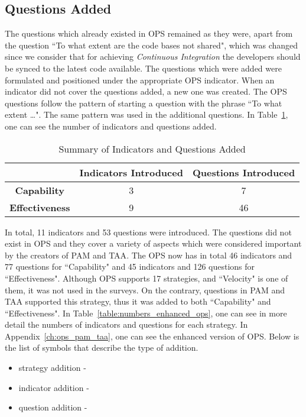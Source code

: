 \subsection{Questions Added}
The questions which already existed in \ac{OPS} remained as they were, apart from the question ``To what extent are the code bases not shared", which was changed since we consider that for achieving \textit{Continuous Integration} the developers should be synced to the latest code available. The questions which were added were formulated and positioned under the appropriate \ac{OPS} indicator. When an indicator did not cover the questions added, a new one was created. The \ac{OPS} questions follow the pattern of starting a question with the phrase ``To what extent \dots ". The same pattern was used in the additional questions. In Table~\ref{table:summary_questions_added}, one can see the number of indicators and questions added. 

\begin{table} [H]
	\caption{Summary of Indicators and Questions Added}
	\label{table:summary_questions_added}
	\begin{tabular}{| c | c | c |} \hline
		 & \textbf{Indicators Introduced} & \textbf{Questions Introduced} \\ \hline
		 \textbf{Capability} & 3 & 7 \\ \hline
		 \textbf{Effectiveness} & 9 & 46 \\ \hline
	\end{tabular}
\end{table}

In total, 11 indicators and 53 questions were introduced. The questions did not exist in \ac{OPS} and they cover a variety of aspects which were considered important by the creators of \ac{PAM} and \ac{TAA}. The \ac{OPS} now has in total 46 indicators and 77 questions for ``Capability" and 45 indicators and 126 questions for ``Effectiveness". Although \ac{OPS} supports 17 strategies, and ``Velocity" is one of them, it was not used in the surveys. On the contrary, questions in \ac{PAM} and \ac{TAA} supported this strategy, thus it was added to both ``Capability" and ``Effectiveness". In Table~\ref{table:numbers_enhanced_ops}, one can see in more detail the numbers of indicators and questions for each strategy. In Appendix~\ref{ch:ops_pam_taa}, one can see the enhanced version of \ac{OPS}. Below is the list of symbols that describe the type of addition.

\begin{itemize}
	\item strategy addition - \TwelweStar
	\item indicator addition - \FiveStarOutline
	\item question addition - \FiveStar
\end{itemize}


